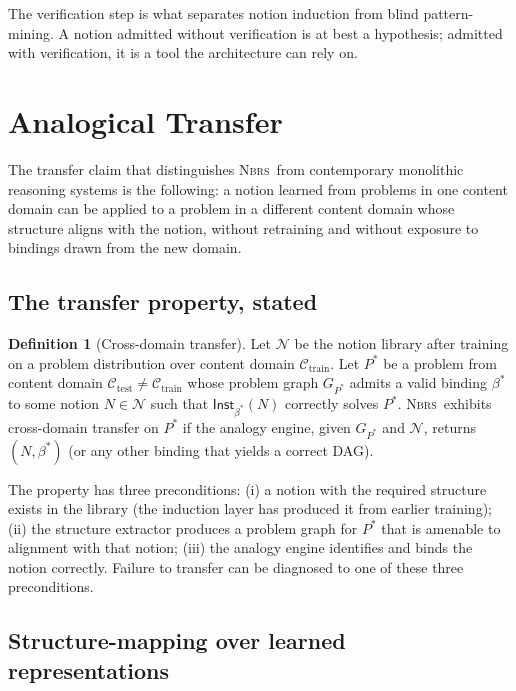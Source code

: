 \documentclass[11pt,a4paper]{article}
\theoremstyle{plain}
\theoremstyle{definition}
\newtheorem{definition}[theorem]{Definition}
\theoremstyle{remark}
\newcommand{\Notions}{\mathcal{N}}
\newcommand{\NBRS}{\textsc{Nbrs}}
\newcommand{\Inst}{\mathsf{Inst}}
\begin{document}
The verification step is what separates notion induction from blind pattern-mining. A notion admitted without verification is at best a hypothesis; admitted with verification, it is a tool the architecture can rely on.

\section{Analogical Transfer}
\label{sec:transfer}

The transfer claim that distinguishes \NBRS\ from contemporary monolithic reasoning systems is the following: a notion learned from problems in one content domain can be applied to a problem in a different content domain whose structure aligns with the notion, without retraining and without exposure to bindings drawn from the new domain.

\subsection{The transfer property, stated}

\begin{definition}[Cross-domain transfer]
\label{def:transfer}
Let $\Notions$ be the notion library after training on a problem distribution over content domain $\mathcal{C}_{\mathrm{train}}$. Let $P^\ast$ be a problem from content domain $\mathcal{C}_{\mathrm{test}} \ne \mathcal{C}_{\mathrm{train}}$ whose problem graph $G_{P^\ast}$ admits a valid binding $\beta^\ast$ to some notion $N \in \Notions$ such that $\Inst_{\beta^\ast}(N)$ correctly solves $P^\ast$. \NBRS\ exhibits cross-domain transfer on $P^\ast$ if the analogy engine, given $G_{P^\ast}$ and $\Notions$, returns $(N, \beta^\ast)$ (or any other binding that yields a correct DAG).
\end{definition}

The property has three preconditions: (i) a notion with the required structure exists in the library (the induction layer has produced it from earlier training); (ii) the structure extractor produces a problem graph for $P^\ast$ that is amenable to alignment with that notion; (iii) the analogy engine identifies and binds the notion correctly. Failure to transfer can be diagnosed to one of these three preconditions.

\subsection{Structure-mapping over learned representations}
\end{document}

